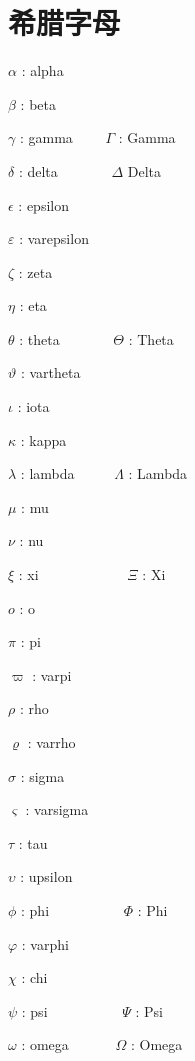 \documentclass[UTF8]{ctexart}
\begin{document}
\tableofcontents

\newpage

\section{希腊字母}

$\alpha$ : alpha \par
$\beta$ : beta \par
$\gamma$ : gamma \ \ \ \ $\Gamma$ : Gamma\par
$\delta$ : delta \ \ \ \ \ \ \ $\Delta$ Delta \par
$\epsilon$ : epsilon \par
$\varepsilon$ : varepsilon\par
$\zeta$ : zeta\par
$\eta$ : eta \par
$\theta$ : theta \ \ \ \ \ \ \ $\Theta$ : Theta\par
$\vartheta$ : vartheta \par
$\iota$ : iota \par
$\kappa$ : kappa \par
$\lambda$ : lambda \ \ \ \ \ $\Lambda$ : Lambda\par
$\mu$ : mu\par
$\nu$ : nu\par
$\xi$ : xi \ \ \ \ \ \ \ \ \ \ \ \ $\Xi$ : Xi\par
$o$ : o\par
$\pi$ : pi \par
$\varpi$ : varpi \par
$\rho$ : rho\par
$\varrho$ : varrho \par
$\sigma$ : sigma \par
$\varsigma$ : varsigma \par
$\tau$ : tau \par
$\upsilon$ : upsilon \par
$\phi$ : phi \ \ \ \ \ \ \ \ \ \ $\Phi$ : Phi\par
$\varphi$ : varphi \par
$\chi$ : chi\par
$\psi$ : psi \ \ \ \ \ \ \ \ \ \ $\Psi$ : Psi\par
$\omega$ : omega \ \ \ \ \ \ $\Omega$ : Omega\par

\newpage
\end{document}

